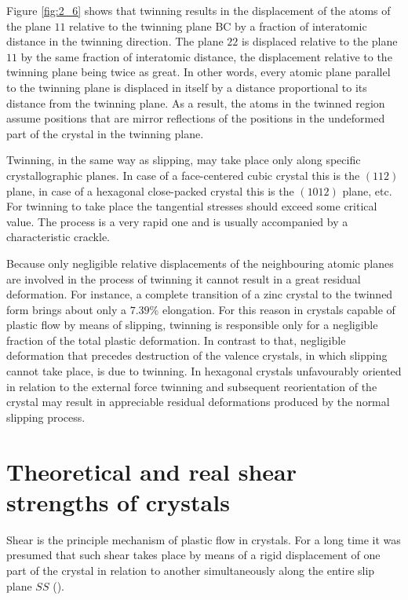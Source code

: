 Figure \ref{fig:2_6} shows that twinning results in the displacement of the atoms of the plane $11$ relative to the twinning plane BC by a fraction of interatomic distance in the twinning direction. The plane $22$ is displaced relative to the plane $11$ by the same fraction of interatomic distance, the displacement relative to the twinning plane being twice as great. In other words, every atomic plane parallel to the twinning plane is displaced in itself by a distance proportional to its distance from the twinning plane. As a result, the atoms in the twinned region assume positions that are mirror reflections of the positions in the undeformed part of the crystal in the twinning plane.

Twinning, in the same way as slipping, may take place only along specific crystallographic planes. In case of a face-centered cubic crystal this is the $(112)$ plane, in case of a hexagonal close-packed crystal this is the $(1012)$ plane, etc. For twinning to take place the tangential stresses should exceed some critical value. The process is a very rapid one and is usually accompanied by a characteristic crackle.

Because only negligible relative displacements of the neighbouring atomic planes are involved in the process of twinning it cannot result in a great residual deformation. For instance, a complete transition of a zinc crystal to the twinned form brings about only a $7.39\%$ elongation. For this reason in crystals capable of plastic flow by means of slipping, twinning is responsible only for a negligible fraction of the total plastic deformation. In contrast to that, negligible deformation that precedes destruction of the valence crystals, in which slipping cannot take place, is due to twinning. In hexagonal crystals unfavourably oriented in relation to the external force twinning and subsequent reorientation of the crystal may result in appreciable residual deformations produced by the normal slipping process.

\section{Theoretical and real shear strengths of crystals}\label{sec:16}

Shear is the principle mechanism of plastic flow in crystals. For a long time it was presumed that such shear takes place by means of a rigid displacement of one part of the crystal in relation to another simultaneously along the entire slip plane $SS$ ().

